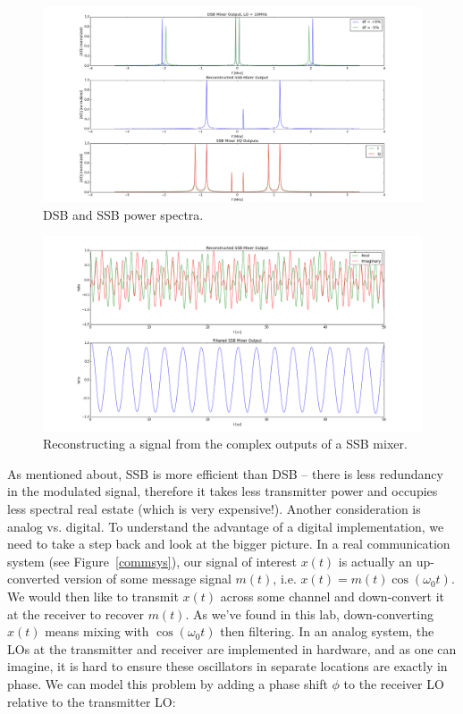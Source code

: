 \documentclass[11pt]{article}
\begin{document}
    \begin{figure}[H]
        \centering
            \includegraphics[width = \textwidth]{2_2_2_dsb_ssb_freq.png}
        \caption{DSB and SSB power spectra.}
        \label{sbfreq}
    \end{figure}

    \begin{figure}[H]
        \centering
            \includegraphics[width = \textwidth]{2_2_2_ssb_time.png}
        \caption{Reconstructing a signal from the complex outputs of a SSB mixer.}
        \label{ssbtime}
    \end{figure}
    
    As mentioned about, SSB is more efficient than DSB -- there is less redundancy in the modulated signal, therefore it takes less transmitter power and occupies less spectral real estate (which is very expensive!). Another consideration is analog vs. digital. To understand the advantage of a digital implementation, we need to take a step back and look at the bigger picture. In a real communication system (see Figure~\ref{commsys}), our signal of interest $x(t)$ is actually an up-converted version of some message signal $m(t)$, i.e. $x(t) = m(t)\cos(\omega_0 t)$. We would then like to transmit $x(t)$ across some channel and down-convert it at the receiver to recover $m(t)$. As we've found in this lab, down-converting $x(t)$ means mixing with $\cos(\omega_0 t)$ then filtering. In an analog system, the LOs at the transmitter and receiver are implemented in hardware, and as one can imagine, it is hard to ensure these oscillators in separate locations are exactly in phase. We can model this problem by adding a phase shift $\phi$ to the receiver LO relative to the transmitter LO:
    
\end{document}
